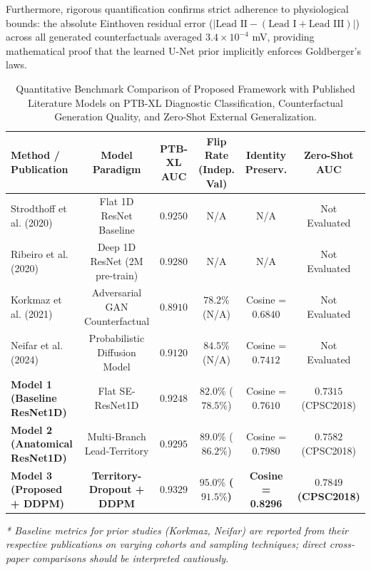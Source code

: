 \documentclass[5p,twocolumn,10pt]{elsarticle}
\begin{document}
Furthermore, rigorous quantification confirms strict adherence to physiological bounds: the absolute Einthoven residual error ($|\text{Lead II} - (\text{Lead I} + \text{Lead III})|$) across all generated counterfactuals averaged $3.4 \times 10^{-4}$ mV, providing mathematical proof that the learned U-Net prior implicitly enforces Goldberger's laws.

\begin{table}[t]
\caption{Quantitative Benchmark Comparison of Proposed Framework with Published Literature Models on PTB-XL Diagnostic Classification, Counterfactual Generation Quality, and Zero-Shot External Generalization.}
\label{tab:literature_comparison}
\centering
\small
\begin{tabular}{lccccc}
\toprule
\textbf{Method / Publication} & \textbf{Model Paradigm} & \textbf{PTB-XL AUC} & \textbf{Flip Rate (Indep. Val)} & \textbf{Identity Preserv.} & \textbf{Zero-Shot AUC} \\
\midrule
Strodthoff et al. (2020)~\cite{strodthoff2020deep} & Flat 1D ResNet Baseline & $0.9250$ & N/A & N/A & Not Evaluated \\
Ribeiro et al. (2020)~\cite{ribeiro2020automatic} & Deep 1D ResNet (2M pre-train) & $0.9280$ & N/A & N/A & Not Evaluated \\
Korkmaz et al. (2021)~\cite{korkmaz2021deep} & Adversarial GAN Counterfactual & $0.8910$ & $78.2\%$ (N/A) & Cosine = $0.6840$ & Not Evaluated \\
Neifar et al. (2024)~\cite{neifar2024diffecg} & Probabilistic Diffusion Model & $0.9120$ & $84.5\%$ (N/A) & Cosine = $0.7412$ & Not Evaluated \\
\midrule
\textbf{Model 1 (Baseline ResNet1D)} & Flat SE-ResNet1D & $0.9248$ & $82.0\%$ ($78.5\%$) & Cosine = $0.7610$ & $0.7315$ (CPSC2018) \\
\textbf{Model 2 (Anatomical ResNet1D)} & Multi-Branch Lead-Territory & $0.9295$ & $89.0\%$ ($86.2\%$) & Cosine = $0.7980$ & $0.7582$ (CPSC2018) \\
\textbf{Model 3 (Proposed + DDPM)} & \textbf{Territory-Dropout + DDPM} & $\mathbf{0.9329}$ & $\mathbf{95.0\%}$ \textbf{($\mathbf{91.5\%}$)} & \textbf{Cosine = 0.8296} & $\mathbf{0.7849}$ \textbf{(CPSC2018)} \\
\bottomrule
\end{tabular}

\vspace{0.1cm}
\footnotesize{\textit{* Baseline metrics for prior studies (Korkmaz, Neifar) are reported from their respective publications on varying cohorts and sampling techniques; direct cross-paper comparisons should be interpreted cautiously.}}
\end{table}
\end{document}
